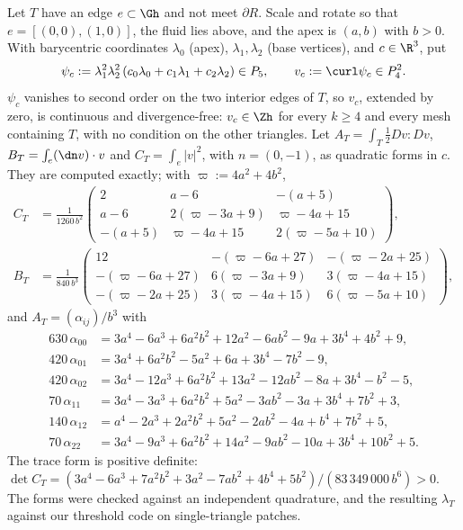 Let $T$ have an edge $e\subset\Gh$ and not meet $\partial R$. Scale and rotate so that $e=[(0,0),(1,0)]$, the fluid lies above, and the apex is $(a,b)$ with $b>0$. With barycentric coordinates $\lambda_0$ (apex), $\lambda_1,\lambda_2$ (base vertices), and $c\in\R^3$, put
\[
\psi_c:=\lambda_1^2\lambda_2^2\,(c_0\lambda_0+c_1\lambda_1+c_2\lambda_2)\in P_5,\qquad v_c:=\curl\psi_c\in P_4^2 .
\]
$\psi_c$ vanishes to second order on the two interior edges of $T$, so $v_c$, extended by zero, is continuous and divergence-free: $v_c\in\Zh$ for every $k\ge4$ and every mesh containing $T$, with no condition on the other triangles. Let $A_T=\int_T\frac12Dv:Dv$, $B_T=\int_e(\dn v)\cdot v$ and $C_T=\int_e|v|^2$, with $n=(0,-1)$, as quadratic forms in $c$. They are computed exactly; with $\varpi:=4a^2+4b^2$,
\begin{align*}
C_T&=\frac1{1260\,b^2}\begin{pmatrix}2&a-6&-(a+5)\\ a-6&2(\varpi-3a+9)&\varpi-4a+15\\ -(a+5)&\varpi-4a+15&2(\varpi-5a+10)\end{pmatrix},\\
B_T&=\frac1{840\,b^3}\begin{pmatrix}12&-(\varpi-6a+27)&-(\varpi-2a+25)\\ -(\varpi-6a+27)&6(\varpi-3a+9)&3(\varpi-4a+15)\\ -(\varpi-2a+25)&3(\varpi-4a+15)&6(\varpi-5a+10)\end{pmatrix},
\end{align*}
and $A_T=(\alpha_{ij})/b^3$ with
\begin{align*}
630\,\alpha_{00}&=3a^4-6a^3+6a^2b^2+12a^2-6ab^2-9a+3b^4+4b^2+9,\\
420\,\alpha_{01}&=3a^4+6a^2b^2-5a^2+6a+3b^4-7b^2-9,\\
420\,\alpha_{02}&=3a^4-12a^3+6a^2b^2+13a^2-12ab^2-8a+3b^4-b^2-5,\\
70\,\alpha_{11}&=3a^4-3a^3+6a^2b^2+5a^2-3ab^2-3a+3b^4+7b^2+3,\\
140\,\alpha_{12}&=a^4-2a^3+2a^2b^2+5a^2-2ab^2-4a+b^4+7b^2+5,\\
70\,\alpha_{22}&=3a^4-9a^3+6a^2b^2+14a^2-9ab^2-10a+3b^4+10b^2+5 .
\end{align*}
The trace form is positive definite: $\det C_T=(3a^4-6a^3+7a^2b^2+3a^2-7ab^2+4b^4+5b^2)/(83\,349\,000\,b^6)>0$. The forms were checked against an independent quadrature, and the resulting $\lambda_T$ against our threshold code on single-triangle patches.

